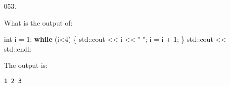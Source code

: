 \documentclass[]{book}
\newenvironment{Shaded}{}{}
\newcommand{\BuiltInTok}[1]{#1}
\newcommand{\ControlFlowTok}[1]{\textcolor[rgb]{0.00,0.44,0.13}{\textbf{#1}}}
\newcommand{\DataTypeTok}[1]{\textcolor[rgb]{0.56,0.13,0.00}{#1}}
\newcommand{\DecValTok}[1]{\textcolor[rgb]{0.25,0.63,0.44}{#1}}
\newcommand{\NormalTok}[1]{#1}
\newcommand{\StringTok}[1]{\textcolor[rgb]{0.25,0.44,0.63}{#1}}
\begin{document}
\vspace{2mm}\noindent\hrulefill{}

\begin{minipage}{\linewidth}\noindent
{\tiny 053.}\\
\begin{minipage}[t]{.485\linewidth}

What is the output of:

\begin{framed}

\begin{Shaded}
\begin{Highlighting}[]
\DataTypeTok{int}\NormalTok{ i = }\DecValTok{1}\NormalTok{;}
\ControlFlowTok{while}\NormalTok{ (i<}\DecValTok{4}\NormalTok{) \{}
  \BuiltInTok{std::}\NormalTok{cout << i << }\StringTok{" "}\NormalTok{;}
\NormalTok{  i = i + }\DecValTok{1}\NormalTok{;}
\NormalTok{\}}
\BuiltInTok{std::}\NormalTok{cout << }\BuiltInTok{std::}\NormalTok{endl;}
\end{Highlighting}
\end{Shaded}

\end{framed}

\end{minipage}
\hfill
\begin{minipage}[t]{.485\linewidth}

The output is:

\begin{framed}

\begin{verbatim}
1 2 3 
\end{verbatim}

\end{framed}

\end{minipage}
\end{minipage}

\vspace{2mm}\noindent\hrulefill{}
\end{document}
